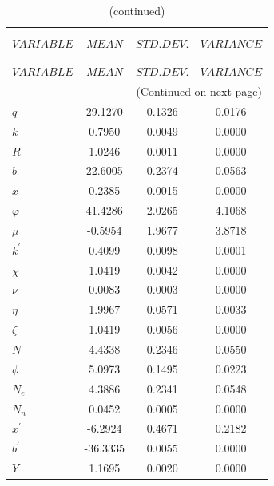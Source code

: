  
\begin{center}
\begin{longtable}{lccc} 
\caption{THEORETICAL MOMENTS}\\
 \label{Table:th_moments}\\
\toprule 
$VARIABLE  $	 & 	 $         MEAN$	 & 	 $    STD. DEV.$	 & 	 $     VARIANCE$\\
\midrule \endfirsthead 
\caption{(continued)}\\
 \toprule \\ 
$VARIABLE  $	 & 	 $         MEAN$	 & 	 $    STD. DEV.$	 & 	 $     VARIANCE$\\
\midrule \endhead 
\midrule \multicolumn{4}{r}{(Continued on next page)} \\ \bottomrule \endfoot 
\bottomrule \endlastfoot 
$q         $	 & 	      29.1270	 & 	       0.1326	 & 	       0.0176 \\ 
$k         $	 & 	       0.7950	 & 	       0.0049	 & 	       0.0000 \\ 
$R         $	 & 	       1.0246	 & 	       0.0011	 & 	       0.0000 \\ 
$b         $	 & 	      22.6005	 & 	       0.2374	 & 	       0.0563 \\ 
$x         $	 & 	       0.2385	 & 	       0.0015	 & 	       0.0000 \\ 
$\varphi   $	 & 	      41.4286	 & 	       2.0265	 & 	       4.1068 \\ 
$\mu       $	 & 	      -0.5954	 & 	       1.9677	 & 	       3.8718 \\ 
$k^\prime  $	 & 	       0.4099	 & 	       0.0098	 & 	       0.0001 \\ 
$\chi      $	 & 	       1.0419	 & 	       0.0042	 & 	       0.0000 \\ 
$\nu       $	 & 	       0.0083	 & 	       0.0003	 & 	       0.0000 \\ 
$\eta      $	 & 	       1.9967	 & 	       0.0571	 & 	       0.0033 \\ 
$\zeta     $	 & 	       1.0419	 & 	       0.0056	 & 	       0.0000 \\ 
$N         $	 & 	       4.4338	 & 	       0.2346	 & 	       0.0550 \\ 
$\phi      $	 & 	       5.0973	 & 	       0.1495	 & 	       0.0223 \\ 
$N_e       $	 & 	       4.3886	 & 	       0.2341	 & 	       0.0548 \\ 
$N_n       $	 & 	       0.0452	 & 	       0.0005	 & 	       0.0000 \\ 
$x^\prime  $	 & 	      -6.2924	 & 	       0.4671	 & 	       0.2182 \\ 
$b^\prime  $	 & 	     -36.3335	 & 	       0.0055	 & 	       0.0000 \\ 
$Y         $	 & 	       1.1695	 & 	       0.0020	 & 	       0.0000 \\ 
\end{longtable}
 \end{center}
